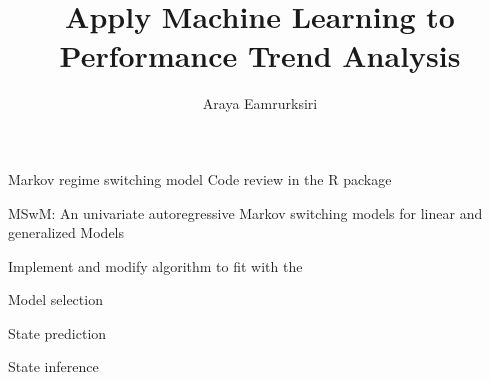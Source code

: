 \documentclass[]{article}
\title{Apply Machine Learning to Performance Trend Analysis}
\author{Araya Eamrurksiri}
\begin{document}
\date{}
\maketitle

Markov regime switching model
Code review in the R package 

MSwM: An univariate autoregressive Markov switching models for linear and generalized Models

Implement and modify algorithm to fit with the




Model selection

State prediction

State inference
\end{document}
